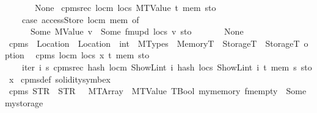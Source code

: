 \begin{isabellebody}
\ \ \ \ {\isacharbar}{\kern0pt}\ {\isacharunderscore}{\kern0pt}\ {\isasymRightarrow}\ None{\isacharparenright}{\kern0pt}{\isachardoublequoteclose}\isanewline
{\isacharbar}{\kern0pt}\ {\isachardoublequoteopen}cpm{}srec\ locm\ locs\ {\isacharparenleft}{\kern0pt}MTValue\ t{\isacharparenright}{\kern0pt}\ mem\ sto\ {\isacharequal}{\kern0pt}\isanewline
\ \ \ \ {\isacharparenleft}{\kern0pt}case\ accessStore\ locm\ mem\ of\isanewline
\ \ \ \ \ \ Some\ {\isacharparenleft}{\kern0pt}MValue\ v{\isacharparenright}{\kern0pt}\ {\isasymRightarrow}\ Some\ {\isacharparenleft}{\kern0pt}fmupd\ locs\ v\ sto{\isacharparenright}{\kern0pt}\isanewline
\ \ \ \ {\isacharbar}{\kern0pt}\ {\isacharunderscore}{\kern0pt}\ {\isasymRightarrow}\ None{\isacharparenright}{\kern0pt}{\isachardoublequoteclose}\isanewline
\isanewline
{}\isamarkupfalse%
\ cpm{}s\ {\isacharcolon}{\kern0pt}{\isacharcolon}{\kern0pt}\ {\isachardoublequoteopen}Location\ {\isasymRightarrow}\ Location\ {\isasymRightarrow}\ int\ {\isasymRightarrow}\ MTypes\ {\isasymRightarrow}\ MemoryT\ {\isasymRightarrow}\ StorageT\ {\isasymRightarrow}\ StorageT\ option{\isachardoublequoteclose}\isanewline
{}\isanewline
\ \ {\isachardoublequoteopen}cpm{}s\ locm\ locs\ x\ t\ mem\ sto\ {\isacharequal}{\kern0pt}\isanewline
\ \ \ \ iter{\isacharprime}{\kern0pt}\ {\isacharparenleft}{\kern0pt}{\isasymlambda}i\ s{\isacharprime}{\kern0pt}{\isachardot}{\kern0pt}\ cpm{}srec\ {\isacharparenleft}{\kern0pt}hash\ locm\ {\isacharparenleft}{\kern0pt}ShowL\isactrlsub i\isactrlsub n\isactrlsub t\ i{\isacharparenright}{\kern0pt}{\isacharparenright}{\kern0pt}\ {\isacharparenleft}{\kern0pt}hash\ locs\ {\isacharparenleft}{\kern0pt}ShowL\isactrlsub i\isactrlsub n\isactrlsub t\ i{\isacharparenright}{\kern0pt}{\isacharparenright}{\kern0pt}\ t\ mem\ s{\isacharprime}{\kern0pt}{\isacharparenright}{\kern0pt}\ sto\ x{\isachardoublequoteclose}\isanewline
\isanewline
{}\isamarkupfalse%
\ cpm{}s{\isacharunderscore}{\kern0pt}def\ {\isacharbrackleft}{\kern0pt}solidity{\isacharunderscore}{\kern0pt}symbex{\isacharbrackright}{\kern0pt}%
\isadelimdocument
%
\endisadelimdocument
%
\isatagdocument
%
\isamarkuptrue%
%
\endisatagdocument
{\isafolddocument}%
%
\isadelimdocument
%
\endisadelimdocument
{}\isamarkupfalse%
\ {\isachardoublequoteopen}cpm{}s\ {\isacharparenleft}{\kern0pt}STR\ {\isacharprime}{\kern0pt}{\isacharprime}{\kern0pt}{}{\isacharprime}{\kern0pt}{\isacharprime}{\kern0pt}{\isacharparenright}{\kern0pt}\ {\isacharparenleft}{\kern0pt}STR\ {\isacharprime}{\kern0pt}{\isacharprime}{\kern0pt}{}{\isacharprime}{\kern0pt}{\isacharprime}{\kern0pt}{\isacharparenright}{\kern0pt}\ {}\ {\isacharparenleft}{\kern0pt}MTArray\ {}\ {\isacharparenleft}{\kern0pt}MTValue\ TBool{\isacharparenright}{\kern0pt}{\isacharparenright}{\kern0pt}\ mymemory\ fmempty\ {\isacharequal}{\kern0pt}\ Some\ mystorage{}{\isachardoublequoteclose}\isanewline

\end{isabellebody}
